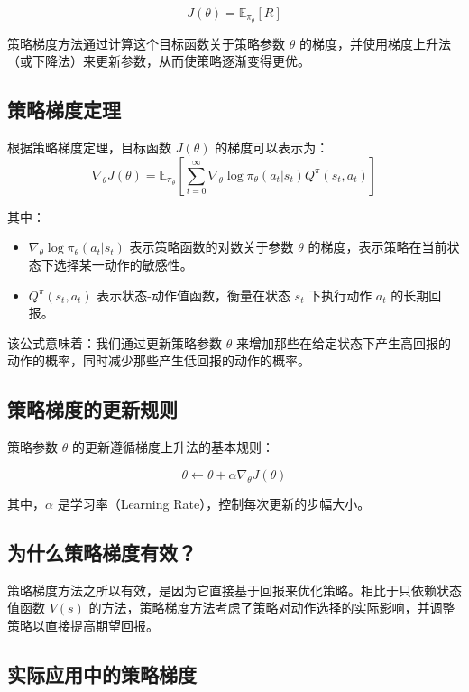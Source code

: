 \documentclass[twocolumn, 10pt]{article} %
\theoremstyle{remark}
\begin{document}
\[
J(\theta) = \mathbb{E}_{\pi_\theta} \left[ R \right]
\]

\noindent 策略梯度方法通过计算这个目标函数关于策略参数 \( \theta \) 的梯度，并使用梯度上升法（或下降法）来更新参数，从而使策略逐渐变得更优。

\subsection{策略梯度定理}

根据策略梯度定理，目标函数 \( J(\theta) \) 的梯度可以表示为：
\[
\nabla_\theta J(\theta) = \mathbb{E}_{\pi_\theta} \left[ \sum_{t=0}^{\infty} \nabla_\theta \log \pi_\theta(a_t | s_t) Q^\pi(s_t, a_t) \right]
\]

\noindent 其中：
\begin{itemize}
    \item \( \nabla_\theta \log \pi_\theta(a_t | s_t) \) 表示策略函数的对数关于参数 \( \theta \) 的梯度，表示策略在当前状态下选择某一动作的敏感性。
    \item \( Q^\pi(s_t, a_t) \) 表示状态-动作值函数，衡量在状态 \( s_t \) 下执行动作 \( a_t \) 的长期回报。
\end{itemize}

该公式意味着：我们通过更新策略参数 \( \theta \) 来增加那些在给定状态下产生高回报的动作的概率，同时减少那些产生低回报的动作的概率。

\subsection{策略梯度的更新规则}

策略参数 \( \theta \) 的更新遵循梯度上升法的基本规则：

\[
\theta \leftarrow \theta + \alpha \nabla_\theta J(\theta)
\]

\noindent 其中，\( \alpha \) 是学习率（Learning Rate），控制每次更新的步幅大小。

\subsection{为什么策略梯度有效？}

策略梯度方法之所以有效，是因为它直接基于回报来优化策略。相比于只依赖状态值函数 \( V(s) \) 的方法，策略梯度方法考虑了策略对动作选择的实际影响，并调整策略以直接提高期望回报。

\subsection{实际应用中的策略梯度}
\end{document}
